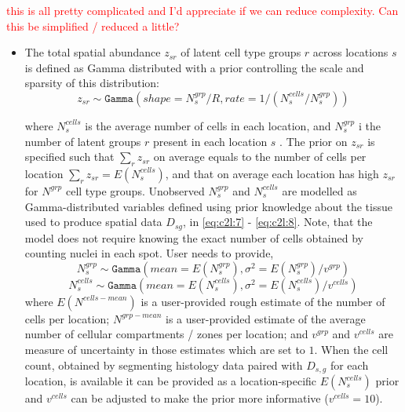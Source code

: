 \documentclass[11pt,a4paper]{article}
\newcommand{\red}{\textcolor{red}}
\begin{document}
\begin{enumerate}
    \red{this is all pretty complicated and I'd appreciate if we can reduce complexity. Can this be simplified / reduced a little?}
    \begin{itemize}
        \item The total spatial abundance $z_{sr}$ of latent cell type groups $r$ across locations $s$ is defined as Gamma distributed with a prior controlling the scale and sparsity of this distribution:
        \begin{equation} \label{eq:c2l:6}
        z_{sr} \sim \mathtt{Gamma}(shape = N_s^{grp} / R, rate = 1 / (N_s^{cells} / N_s^{grp}))
        \end{equation}
    
        where $N_s^{cells}$ is the average number of cells in each location, and $N_s^{grp}$ i the number of latent groups $r$  present in each location $s$ . \newline
        The prior on $z_{sr}$ is specified such that $\sum_{r} z_{sr}$ on average equals to the number of cells per location $\sum_{r} z_{sr} = E(N_s^{cells})$, and that on average each location has high $z_{sr}$ for $N^{grp}$ cell type groups. \newline
        Unobserved $N_s^{grp}$ and $N_s^{cells}$ are modelled as Gamma-distributed variables defined using prior knowledge about the tissue used to produce spatial data $D_{sg}$, in \ref{eq:c2l:7} - \ref{eq:c2l:8}. Note, that the model does not require knowing the exact number of cells obtained by counting nuclei in each spot. \newline
        User needs to provide,   \newline
        \begin{equation} \label{eq:c2l:7}
        N_s^{grp} \sim \mathtt{Gamma}(mean=E(N_s^{grp}), \sigma^2=E(N_s^{grp}) / v^{grp})
        \end{equation}
        \begin{equation} \label{eq:c2l:8}
        N_s^{cells} \sim \mathtt{Gamma}(mean=E(N_s^{cells}), \sigma^2=E(N_s^{cells}) / v^{cells})
        \end{equation}
        where $E(N^{cells-mean})$ is a user-provided rough estimate of the number of cells per location; $N^{grp-mean}$ is a user-provided estimate of the average number of cellular compartments / zones per location; and $v^{grp}$ and $v^{cells}$ are measure of uncertainty in those estimates which are set to $1$.
        When the cell count, obtained by segmenting histology data paired with $D_{s,g}$ for each location, is available it can be provided as a location-specific $E(N_s^{cells})$ prior and $v^{cells}$ can be adjusted to make the prior more informative ($v^{cells}=10$).
        

\end{itemize}
\end{enumerate}
\end{document}
